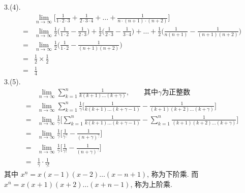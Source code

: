	3.(4).
	\begin{align*}
		&\lim_{n\rightarrow\infty}\Big[\frac{1}{1\cdot2\cdot3}+\frac{1}{2\cdot3\cdot4} +\dots +\frac{1}{n\cdot(n+1)\cdot(n+2)} \Big]\\
		=&\lim_{n\rightarrow\infty}\frac{1}{2}\Big(\frac{1}{1\cdot2}-\frac{1}{2\cdot3}\Big)+\frac{1}{2}\Big(\frac{1}{2\cdot3}-\frac{1}{3\cdot4}\Big)+\dots+\frac{1}{2}\Big(\frac{1}{n(n+1)}-\frac{1}{(n+1)(n+2)}\Big)\\
		=&\lim_{n\rightarrow\infty}\frac{1}{2}\Big(\frac{1}{1\cdot2}-\frac{1}{(n+1)(n+2)}\Big)\\
		=&\frac{1}{2}\times\frac{1}{2}\\
		=&\frac{1}{4}
	\end{align*}
	3.(5).
	\begin{align*}
		&\lim_{n\rightarrow\infty}\sum_{k=1}^{n}\frac{1}{k(k+1)\dots(k+\gamma)},
		\qquad \text{其中}\gamma\text{为正整数}\\
		=&\lim_{n\rightarrow\infty} \sum_{k=1}^n \frac{1}{\gamma} \Big[\frac{1}{k(k+1)\dots(k+\gamma-1)}-\frac{1}{(k+1)(k+2)\dots(k+\gamma)}\Big]\\
		=&\lim_{n\rightarrow\infty}\frac{1}{\gamma}
		\Big[\sum_{k=1}^n \frac{1}{k(k+1)\dots(k+\gamma-1)}-\sum_{k=1}^n \frac{1}{(k+1)(k+2)\dots(k+\gamma)}\Big]\\
		=&\lim_{n\rightarrow\infty} \frac{1}{\gamma}\Big[\frac{1}{\gamma^{\underline{\gamma}}}-\frac{1}{(n+\gamma)^{\underline{\gamma}}}\Big]\\
		=&\lim_{n\rightarrow\infty} \frac{1}{\gamma}\Big[\frac{1}{\gamma!}-\frac{1}{(n+\gamma)^{\underline{\gamma}}}\Big]\\
		=&\frac{1}{\gamma}\cdot\frac{1}{\gamma!}		
	\end{align*}	
其中 $ x^{\underline{n}} = x(x-1)(x-2)\dots(x-n+1) $, 称为下阶乘. 而$ x^{\overline{n}} = x(x+1)(x+2)\dots(x+n-1) $, 称为上阶乘. 

